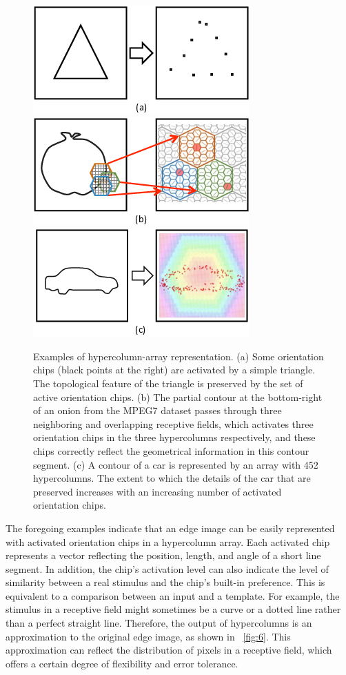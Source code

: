 \documentclass{article}
\begin{document}
\begin{figure}[!t]
\centering
\includegraphics[width=0.25\linewidth]{images/fig3.png}\hfil%
\includegraphics[width=0.25\linewidth]{images/fig4.png}\hfil%
\includegraphics[width=0.25\linewidth]{images/fig5.png}
\caption{Examples of hypercolumn-array representation.
(a) Some orientation chips (black points at the right) are activated by a simple triangle.
The topological feature of the triangle is preserved by the set of active orientation chips.
(b) The partial contour at the bottom-right of an onion from the MPEG7 dataset 
passes through three neighboring and overlapping receptive fields, 
which activates three orientation chips in the three hypercolumns respectively, 
and these chips correctly reflect the geometrical information in this contour segment.
(c) A contour of a car is represented by an array with 452 hypercolumns. 
The extent to which the details of the car that are preserved increases 
with an increasing number of activated orientation chips.}
\label{fig:3to5}
\end{figure}

The foregoing examples indicate that an edge image can be easily represented with activated orientation chips in a hypercolumn array. 
Each activated chip represents a vector reflecting the position, length, and angle of a short line segment. 
In addition, the chip's activation level can also indicate the level of similarity between a real stimulus and the chip's built-in preference. 
This is equivalent to a comparison between an input and a template. 
For example, the stimulus in a receptive field might sometimes be a curve or a dotted line rather than a perfect straight line. 
Therefore, the output of hypercolumns is an approximation to the original edge image, 
as shown in \figurename~\ref{fig:6}. 
This approximation can reflect the distribution of pixels in a receptive field, which offers a certain degree of flexibility and error tolerance.
\end{document}
